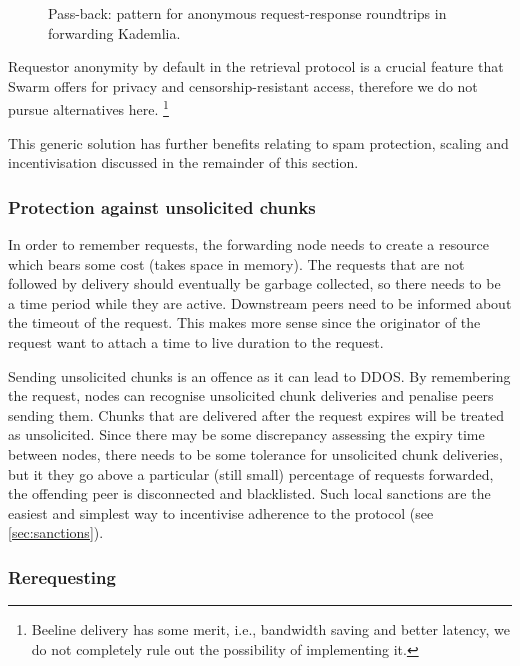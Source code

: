 \begin{figure}[htbp]
   \centering
   \caption[Pass-back: pattern for anonymous request-response roundtrips in forwarding Kademlia]{Pass-back: pattern for anonymous request-response roundtrips in forwarding Kademlia.}
   \label{fig:request-response}
\end{figure}

Requestor anonymity by default in the retrieval protocol is a crucial feature that Swarm offers for privacy and censorship-resistant access, therefore we do not pursue alternatives here.%
%
\footnote{Beeline delivery has some merit, i.e., bandwidth saving and better latency, we do not completely rule out the possibility of implementing it. 
}


This generic solution has further benefits relating to spam protection, scaling and incentivisation discussed in the remainder of this section.

\subsubsection{Protection against unsolicited chunks}

In order to remember requests, the forwarding node needs to create a resource which bears some cost (takes space in memory). The requests that are not followed by delivery should eventually be garbage collected, so there needs to be a time period while they are active. Downstream peers need to be informed about the timeout of the request. This makes more sense since the originator of the request want to attach a time to live duration to the request.  

Sending unsolicited chunks is an offence as it can lead to DDOS. By remembering the request, nodes can recognise unsolicited chunk deliveries and penalise peers sending them. Chunks that are delivered after the request expires will be treated as unsolicited. Since there may be some discrepancy assessing the expiry time between nodes, there needs to be some tolerance for unsolicited chunk deliveries, but it they go above a particular (still small) percentage of requests forwarded, the offending peer is disconnected and blacklisted. Such local sanctions are the easiest and simplest way to incentivise adherence to the protocol (see \ref{sec:sanctions}). 

\subsubsection{Rerequesting}

